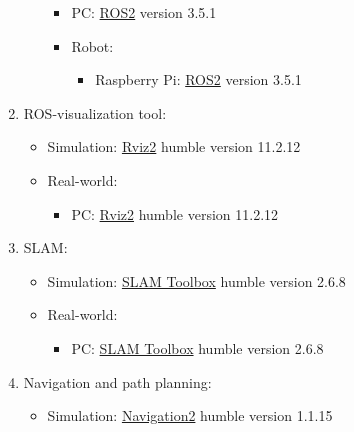 \begin{enumerate}
\begin{itemize}
        \begin{itemize}
            \item PC: \href{https://docs.ros.org/en/humble/index.html}{ROS2}\:\cite{macenski_impact_2023}\cite{macenski_robot_2022} version 3.5.1
            \item Robot:
            \begin{itemize}
                \item Raspberry Pi: \href{https://docs.ros.org/en/humble/index.html}{ROS2}\:\cite{macenski_impact_2023}\cite{macenski_robot_2022} version 3.5.1
            \end{itemize}
        \end{itemize}
    \end{itemize}
    \item ROS-visualization tool:
    \begin{itemize}
        \item Simulation: \href{https://turtlebot.github.io/turtlebot4-user-manual/software/rviz.html}{Rviz2} humble version 11.2.12 
        \item Real-world:
        \begin{itemize}
            \item PC: \href{https://turtlebot.github.io/turtlebot4-user-manual/software/rviz.html}{Rviz2} humble version 11.2.12 
        \end{itemize}
    \end{itemize}
    \item SLAM:
    \begin{itemize}
        \item Simulation: \href{https://wiki.ros.org/slam_toolbox}{SLAM Toolbox}\:\cite{macenski_slam_2021}\cite{macenski_use_2019} humble version 2.6.8
        \item Real-world: 
        \begin{itemize}
            \item PC: \href{https://wiki.ros.org/slam_toolbox}{SLAM Toolbox}\:\cite{macenski_slam_2021}\cite{macenski_use_2019} humble version 2.6.8
        \end{itemize}
    \end{itemize}
    \item Navigation and path planning:
    \begin{itemize}
        \item Simulation: \href{https://navigation.ros.org/tutorials/docs/navigation2_with_slam.html}{Navigation2}\:\cite{macenski_desks_2023}\cite{macenski_open-source_2024}\cite{macenski_regulated_2023}\cite{merzlyakov_comparison_2021}\cite{macenski_marathon_2020} humble version 1.1.15 

\end{itemize}
\end{enumerate}
